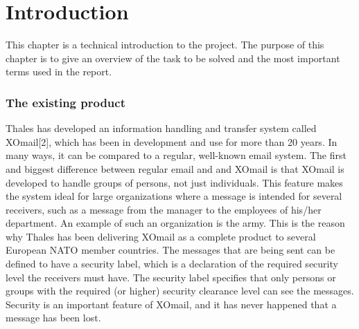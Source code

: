 \chapter{Introduction}

This chapter is a technical introduction to the project. The purpose of this chapter is to give an overview of the task to be solved and the most important terms used in the report.

\subsection*{The existing product}
Thales has developed an information handling and transfer system called XOmail[2], which has been in development and use for more than 20 years. In many ways, it can be compared to a regular, well-known email system. The first and biggest difference between regular email and and XOmail is that XOmail is developed to handle groups of persons, not just individuals. This feature makes the system ideal for large organizations where a message is intended for several receivers, such as a message from the manager to the employees of his/her department. An example of such an organization is the army. This is the reason why Thales has been delivering XOmail as a complete product to several European NATO member countries.  
\newline
\newline
The messages that are being sent can be defined to have a security label, which is a declaration of the required security level the receivers must have. The security label specifies that only persons or groups with the required (or higher) security clearance level can see the messages. Security is an important feature of XOmail, and it has never happened that a message has been lost. 

